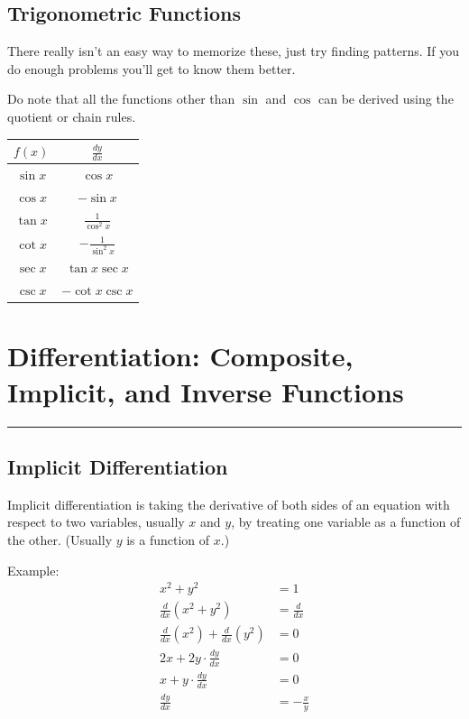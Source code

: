 \documentclass[12pt]{article}
\newcommand{\fline}{\par\noindent\rule{\textwidth}{0.1pt}} %
\begin{document}
\subsection{Trigonometric Functions}
There really isn't an easy way to memorize these, just try finding patterns. If you do enough problems you'll get to know them better.

Do note that all the functions other than $\sin$ and $\cos$ can be derived using the quotient or chain rules.
\begin{center}
    \begin{tabular}{|c|c|}
        \hline
        $f(x)$    & $\frac{dy}{dx}$        \\
        \hline \hline
        $\sin{x}$ & $\cos{x}$              \\
        \hline
        $\cos{x}$ & $-\sin{x}$             \\
        \hline
        $\tan{x}$ & $\frac{1}{\cos^2{x}}$  \\
        \hline \hline
        $\cot{x}$ & $-\frac{1}{\sin^2{x}}$ \\
        \hline
        $\sec{x}$ & $\tan{x} \sec{x}$      \\
        \hline
        $\csc{x}$ & $-\cot{x} \csc{x}$     \\
        \hline
    \end{tabular}
\end{center}

\section{Differentiation: Composite, Implicit, and Inverse Functions}
\fline
\subsection{Implicit Differentiation}
Implicit differentiation is taking the derivative of both sides of an equation with respect to two variables, usually $x$ and $y$, by treating one variable as a function of the other. (Usually $y$ is a function of $x$.)

\noindent Example:
\begin{align*}
    x^2 + y^2                                                         & = 1            \\
    \frac{d}{dx} \left( x^2 + y^2 \right)                             & = \frac{d}{dx} \\[6pt]
    \frac{d}{dx} \left( x^2 \right) + \frac{d}{dx} \left( y^2 \right) & = 0            \\[6pt]
    2x + 2y \cdot \frac{dy}{dx}                                       & = 0            \\[6pt]
    x + y \cdot \frac{dy}{dx}                                         & = 0            \\[6pt]
    \frac{dy}{dx}                                                     & = -\frac{x}{y}
\end{align*}
\end{document}
